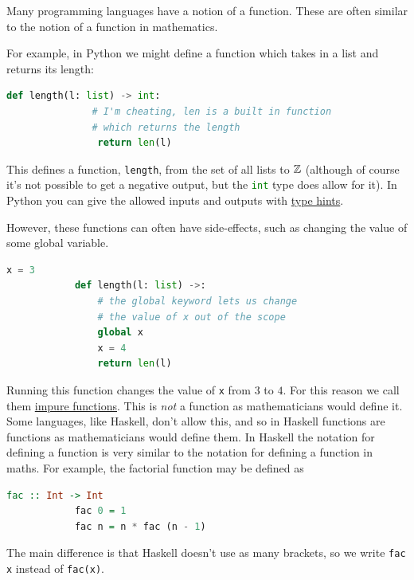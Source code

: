 \documentclass[fleqn]{LectureClass/LectureClass}
\begin{document}
    \begin{remark}{}{}
        Many programming languages have a notion of a function.
        These are often similar to the notion of a function in mathematics.
        
        For example, in Python we might define a function which takes in a list and returns its length:
        \begin{lstlisting}[gobble=12, language=python, basicstyle=\color{black!85}\ttfamily]
            def length(l: list) -> int:
               # I'm cheating, len is a built in function
               # which returns the length
                return len(l)
        \end{lstlisting}
        This defines a function, \lstinline[language=python, basicstyle=\color{black!85}\ttfamily]|length|, from the set of all lists to \(\mathbb{Z}\) (although of course it's not possible to get a negative output, but the \lstinline[language=python, basicstyle=\color{black!85}\ttfamily]|int| type does allow for it).
        In Python you can give the allowed inputs and outputs with \href{https://docs.python.org/3/library/typing.html}{type hints}.
        
        However, these functions can often have side-effects, such as changing the value of some global variable.
        \begin{lstlisting}[gobble=12, language=python, basicstyle=\color{black!85}\ttfamily]
            x = 3
            def length(l: list) ->:
                # the global keyword lets us change
                # the value of x out of the scope
                global x
                x = 4
                return len(l)
        \end{lstlisting}
        Running this function changes the value of \lstinline[language=python, basicstyle=\color{black!85}\ttfamily]|x| from \(3\) to \(4\).
        For this reason we call them \href{https://en.wikipedia.org/wiki/Pure_function}{impure functions}.
        This is \emph{not} a function as mathematicians would define it.
        Some languages, like Haskell, don't allow this, and so in Haskell functions are functions as mathematicians would define them.
        In Haskell the notation for defining a function is very similar to the notation for defining a function in maths.
        For example, the factorial function may be defined as
        \begin{lstlisting}[gobble=12, language=haskell, basicstyle=\color{black!85}\ttfamily]
            fac :: Int -> Int
            fac 0 = 1
            fac n = n * fac (n - 1)
        \end{lstlisting}
        The main difference is that Haskell doesn't use as many brackets, so we write \lstinline[language=haskell, basicstyle=\color{black!85}\ttfamily]|fac x| instead of \lstinline[language=haskell, basicstyle=\color{black!85}\ttfamily]|fac(x)|.
    \end{remark}
    
\end{document}
